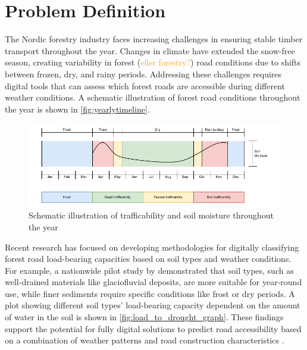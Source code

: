 \section{Problem Definition}
The Nordic forestry industry faces increasing challenges in ensuring stable timber transport throughout the year. Changes in climate have extended the snow-free season, creating variability in forest (\textcolor{orange}{eller forestry?}) road conditions due to shifts between frozen, dry, and rainy periods. Addressing these challenges requires digital tools that can assess which forest roads are accessible during different weather conditions. A schematic illustration of forest road conditions throughout the year is shown in \autoref{fig:yearlytimeline}.

\begin{figure}[h]
    \centering
    \centerline{\includegraphics[width=1.1\linewidth]{figures/yearlytimeline.pdf}}
    \caption{Schematic illustration of trafficability and soil moisture throughout the year}
    \label{fig:yearlytimeline}
\end{figure}

Recent research has focused on developing methodologies for digitally classifying forest road load-bearing capacities based on soil types and weather conditions. For example, a nationwide pilot study by \textcite{fjeld2023trafficability} demonstrated that soil types, such as well-drained materials like \gls{glaciofluvial deposit}s, are more suitable for year-round use, while finer sediments require specific conditions like frost or dry periods. A plot showing different soil types' load-bearing capacity dependent on the amount of water in the soil is shown in \autoref{fig:load_to_drought_graph}. These findings support the potential for fully digital solutions to predict road accessibility based on a combination of weather patterns and road construction characteristics \cite{fjeld2023trafficability}.

